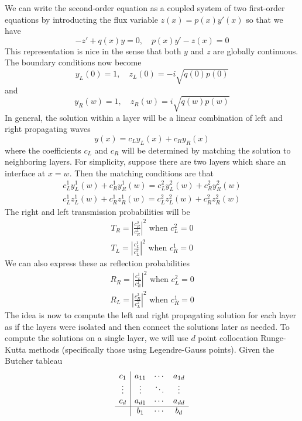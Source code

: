 \documentclass[a4paper,12pt]{article}
\begin{document}
We can write the second-order equation as a coupled system of two first-order equations
by introducting the flux variable $z(x) = p(x) y'(x)$ so that we have
\begin{equation}
-z'+q(x)y=0,\quad p(x)y'-z(x) = 0
\end{equation}
This representation is nice in the sense that both $y$ and $z$ are globally continuous. 
The boundary conditions now become
\begin{equation}
y_L(0) = 1,\quad z_L(0) = -i\sqrt{q(0)p(0)}
\label{eqn:leftcond}
\end{equation}
and
\begin{equation}
y_R(w) = 1,\quad z_R(w) = i\sqrt{q(w)p(w)}
\label{eqn:rightcond}
\end{equation}
In general, the solution within a layer will be a linear combination of
left and right propagating waves
\begin{equation}
y(x) = c_L y_L(x) + c_R y_R(x)
\end{equation}
where the coefficients $c_L$ and $c_R$ will be determined by matching the solution
to neighboring layers. For simplicity, suppose there are two layers which share an 
interface at $x=w$. Then the matching conditions are that
\begin{align}
c_L^1 y_L^1(w) + c_R^1 y_R^1(w) = c_L^2 y_L^2(w) + c_R^2 y_R^2(w) \\
c_L^1 z_L^1(w) + c_R^1 z_R^1(w) = c_L^2 z_L^2(w) + c_R^2 z_R^2(w) 
\end{align}
The right and left transmission probabilities will be
\begin{align}
T_R = \left|\frac{c_R^2}{c_R^1}\right|^2 \text{ when } c_L^2=0\\
T_L = \left|\frac{c_L^1}{c_L^2}\right|^2 \text{ when } c_R^1=0
\end{align}
We can also express these as reflection probabilities
\begin{align}
R_R = \left|\frac{c_L^1}{c_R^1}\right|^2 \text{ when } c_L^2 = 0 \\
R_L = \left|\frac{c_R^2}{c_L^2}\right|^2 \text{ when } c_R^1 = 0
\end{align}
The idea is now to compute the left and right propagating solution for each layer as 
if the layers were isolated and then connect the solutions later as needed. To 
compute the solutions on a single layer, we will use $d$ point collocation 
Runge-Kutta methods (specifically those using Legendre-Gauss points). Given the Butcher
tableau
\begin{equation}
\begin{array}{c|ccc}
c_1    & a_{11} & \cdots & a_{1d} \\
\vdots & \vdots & \ddots & \vdots \\
c_d    & a_{d1} & \cdots & a_{dd} \\
\hline
       & b_1    & \cdots & b_d
\end{array}
\end{equation}
\end{document}
